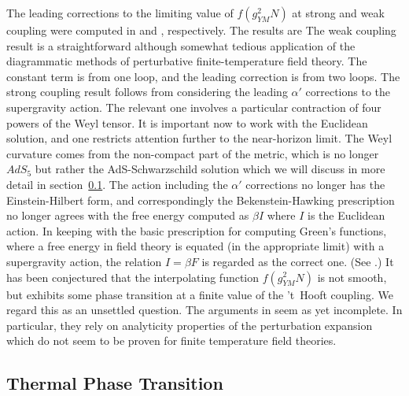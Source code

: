 The leading corrections to the limiting value of $f(g_{YM}^2 N)$ at
strong and weak coupling were computed in \cite{Gubser:1998nz} and
\cite{Fotopoulos:1999es}, respectively.  The results are 
 The weak coupling result is a straightforward although somewhat tedious
application of the diagrammatic methods of perturbative finite-temperature
field theory.  The constant term is from one loop, and the leading
correction is from two loops.  The strong coupling result follows from
considering the leading $\alpha'$ corrections to the supergravity action.
The relevant one involves a particular contraction of four powers of the
Weyl tensor.  It is important now to work with the Euclidean solution, and
one restricts attention further to the near-horizon limit.  The Weyl
curvature comes from the non-compact part of the metric, which is no longer
$AdS_5$ but rather the AdS-Schwarzschild solution which we will discuss in
more detail in section~\ref{TPhaseT}.  The action including the
   $\alpha'$ corrections no longer has the
Einstein-Hilbert form, and correspondingly the Bekenstein-Hawking
prescription no longer agrees with the free energy computed as $\beta I$
where $I$ is the Euclidean action.  In keeping with the basic prescription
for computing Green's functions, where a free energy in field theory is
equated (in the appropriate limit)
with a supergravity action, the relation $I = \beta F$ is regarded
as the correct one.
(See \cite{Wald:1993nt}.)
It has been conjectured that the interpolating function $f(g_{YM}^2
N)$ is not smooth, but exhibits some phase transition at a finite
value of the 't~Hooft coupling.  We regard this as an unsettled
question.  The arguments in \cite{Li:1999kd,Gao:1998ww} 
seem as yet incomplete.  In
particular, they rely on analyticity properties of the perturbation
expansion which do not seem to be proven for finite temperature field
theories.



\subsection{Thermal Phase Transition}
\label{TPhaseT}

